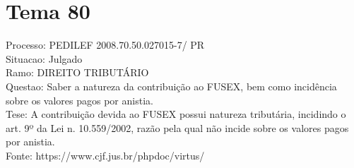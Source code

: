 \documentclass[12pt]{article}
\begin{document}
\section*{Tema 80}
Processo: PEDILEF 2008.70.50.027015-7/ PR\\
Situacao: Julgado\\
Ramo: DIREITO TRIBUTÁRIO\\
Questao: Saber a natureza da contribuição ao FUSEX, bem como incidência sobre os valores pagos por anistia.\\
Tese: A contribuição devida ao FUSEX possui natureza tributária, incidindo o art. 9º da Lei n. 10.559/2002, razão pela qual não incide sobre os valores pagos por anistia.\\
Fonte: https://www.cjf.jus.br/phpdoc/virtus/
\end{document}
